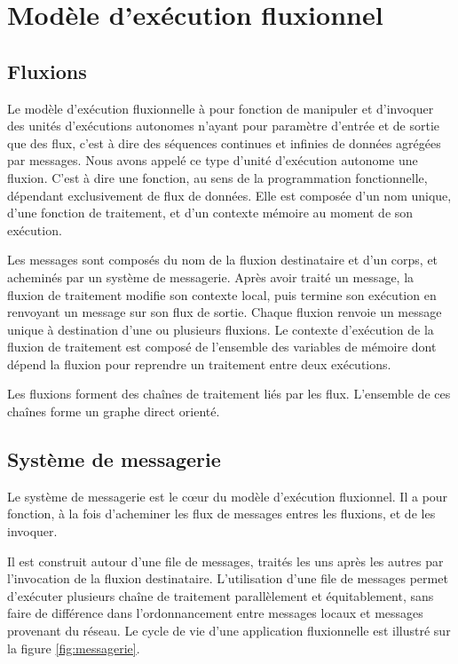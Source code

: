 \section{Modèle d'exécution fluxionnel}

\subsection{Fluxions}

Le modèle d'exécution fluxionnelle à pour fonction de manipuler et d'invoquer des unités d'exécutions autonomes n'ayant pour paramètre d'entrée et de sortie que des flux, c'est à dire des séquences continues et infinies de données agrégées par messages.
Nous avons appelé ce type d'unité d'exécution autonome une fluxion.
C'est à dire une fonction, au sens de la programmation fonctionnelle, dépendant exclusivement de flux de données.
Elle est composée d'un nom unique, d'une fonction de traitement, et d'un contexte mémoire au moment de son exécution.

Les messages sont composés du nom de la fluxion destinataire et d'un corps, et acheminés par un système de messagerie.
Après avoir traité un message, la fluxion de traitement modifie son contexte local, puis termine son exécution en renvoyant un message sur son flux de sortie.
Chaque fluxion renvoie un message unique à destination d'une ou plusieurs fluxions.
Le contexte d'exécution de la fluxion de traitement est composé de l'ensemble des variables de mémoire dont dépend la fluxion pour reprendre un traitement entre deux exécutions.

Les fluxions forment des chaînes de traitement liés par les flux.
L'ensemble de ces chaînes forme un graphe direct orienté.

\subsection{Système de messagerie}

Le système de messagerie est le cœur du modèle d'exécution fluxionnel.
Il a pour fonction, à la fois d'acheminer les flux de messages entres les fluxions, et de les invoquer.

Il est construit autour d'une file de messages, traités les uns après les autres par l'invocation de la fluxion destinataire.
L'utilisation d'une file de messages permet d'exécuter plusieurs chaîne de traitement parallèlement et équitablement, sans faire de différence dans l'ordonnancement entre messages locaux et messages provenant du réseau.
Le cycle de vie d'une application fluxionnelle est illustré sur la figure \ref{fig:messagerie}.


